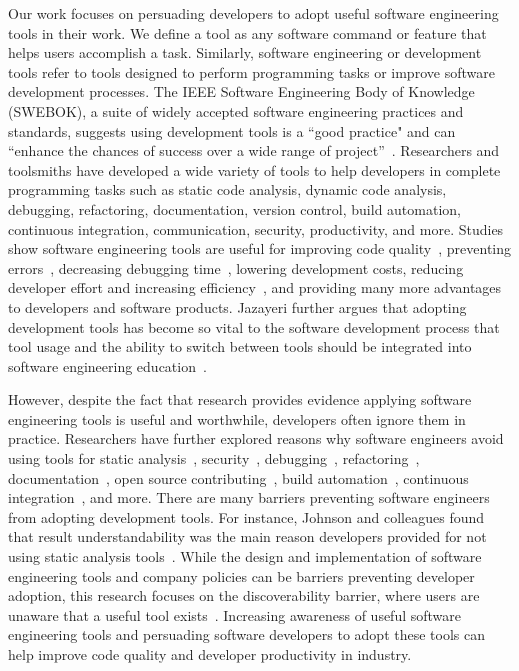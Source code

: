 Our work focuses on persuading developers to adopt useful software engineering tools in their work. We define a tool as any software command or feature that helps users accomplish a task. Similarly, software engineering or development tools refer to tools designed to perform programming tasks or improve software development processes. The IEEE Software Engineering Body of Knowledge (SWEBOK), a suite of widely accepted software engineering practices and standards, suggests using development tools is a ``good practice" and can ``enhance the chances of success over a wide range of project”~\cite[p.~A-4]{SWEBOK}. Researchers and toolsmiths have developed a wide variety of tools to help developers in complete programming tasks such as static code analysis, dynamic code analysis, debugging, refactoring, documentation, version control, build automation, continuous integration, communication, security, productivity, and more. Studies show software engineering tools are useful for improving code quality~\cite{GoogleFixit}, preventing errors~\cite{bessey2010few}, decreasing debugging time~\cite{Williams2007FaultFixTime}, lowering development costs, reducing developer effort and increasing efficiency~\cite{singh2017staticreview}, and providing many more advantages to developers and software products. Jazayeri further argues that adopting development tools has become so vital to the software development process that tool usage and the ability to switch between tools should be integrated into software engineering education~\cite{jazayeri2004education}.

However, despite the fact that research provides evidence applying software engineering tools is useful and worthwhile, developers often ignore them in practice. Researchers have further explored reasons why software engineers avoid using tools for static analysis~\cite{Johnson2013Why}, security~\cite{Xiao2014Security},  debugging~\cite{Cao2010Debugging}, refactoring~\cite{Murphy-HillBarriersRefactoring}, documentation~\cite{Forward2002Documentation}, open source contributing~\cite{mendez2017open}, build automation~\cite{Akond2017BuildTools}, continuous integration~\cite{hilton2017CI}, and more. There are many barriers preventing software engineers from adopting development tools. For instance, Johnson and colleagues found that result understandability was the main reason developers provided for not using static analysis tools~\cite{Johnson2013Why}. While the design and implementation of software engineering tools and company policies can be barriers preventing developer adoption, this research focuses on the discoverability barrier, where users are unaware that a useful tool exists~\cite{Murphy-HillScreencastingDiscovery}. Increasing awareness of useful software engineering tools and persuading software developers to adopt these tools can help improve code quality and developer productivity in industry.

